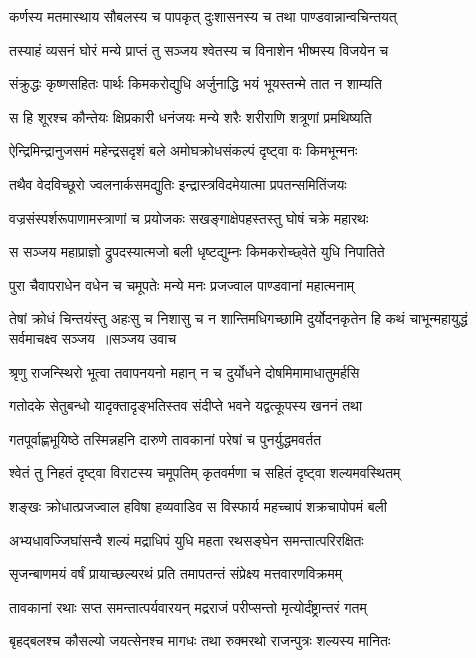 \twolineshloka
{कर्णस्य मतमास्थाय सौबलस्य च पापकृत्}
{दुःशासनस्य च तथा पाण्डवान्नान्वचिन्तयत्}


\twolineshloka
{तस्याहं व्यसनं घोरं मन्ये प्राप्तं तु सञ्जय}
{श्वेतस्य च विनाशेन भीष्मस्य विजयेन च}


\twolineshloka
{संक्रुद्धः कृष्णसहितः पार्थः किमकरोद्युधि}
{अर्जुनाद्धि भयं भूयस्तन्मे तात न शाम्यति}


\twolineshloka
{स हि शूरश्च कौन्तेयः क्षिप्रकारी धनंजयः}
{मन्ये शरैः शरीराणि शत्रूणां प्रमथिष्यति}


\twolineshloka
{ऐन्द्रिमिन्द्रानुजसमं महेन्द्रसदृशं बले}
{अमोघक्रोधसंकल्पं दृष्ट्वा वः किमभून्मनः}


\twolineshloka
{तथैव वेदविच्छूरो ज्वलनार्कसमद्युतिः}
{इन्द्रास्त्रविदमेयात्मा प्रपतन्समितिंजयः}


\twolineshloka
{वज्रसंस्पर्शरूपाणामस्त्राणां च प्रयोजकः}
{सखङ्गाक्षेपहस्तस्तु घोषं चक्रे महारथः}


\twolineshloka
{स सञ्जय महाप्राज्ञो द्रुपदस्यात्मजो बली}
{धृष्टद्युम्नः किमकरोच्छ्वेते युधि निपातिते}


\twolineshloka
{पुरा चैवापराधेन वधेन च चमूपतेः}
{मन्ये मनः प्रजज्वाल पाण्डवानां महात्मनाम्}


\fourlineindentedshloka
{तेषां क्रोधं चिन्तयंस्तु अहःसु च निशासु च}
{न शान्तिमधिगच्छामि दुर्योदनकृतेन हि}
{कथं चाभून्महायुद्धं सर्वमाचक्ष्व सञ्जय ॥सञ्जय उवाच}
{}


\twolineshloka
{श्रृणु राजन्स्थिरो भूत्वा तवापनयनो महान्}
{न च दुर्योधने दोषमिमामाधातुमर्हसि}


\twolineshloka
{गतोदके सेतुबन्धो यादृक्तादृङ्भतिस्तव}
{संदीप्ते भवने यद्वत्कूपस्य खननं तथा}


\twolineshloka
{गतपूर्वाह्णभूयिष्ठे तस्मिन्नहनि दारुणे}
{तावकानां परेषां च पुनर्युद्धमवर्तत}


\twolineshloka
{श्वेतं तु निहतं दृष्ट्वा विराटस्य चमूपतिम्}
{कृतवर्मणा च सहितं दृष्ट्वा शल्यमवस्थितम्}


\twolineshloka
{शङ्खः क्रोधात्प्रजज्वाल हविषा हव्यवाडिव}
{स विस्फार्य महच्चापं शक्रचापोपमं बली}


\twolineshloka
{अभ्यधावज्जिघांसन्वै शल्यं मद्राधिपं युधि}
{महता रथसङ्घेन समन्तात्परिरक्षितः}


\twolineshloka
{सृजन्बाणमयं वर्षं प्रायाच्छल्यरथं प्रति}
{तमापतन्तं संप्रेक्ष्य मत्तवारणविक्रमम्}


\twolineshloka
{तावकानां रथाः सप्त समन्तात्पर्यवारयन्}
{मद्रराजं परीप्सन्तो मृत्योर्दंष्ट्रान्तरं गतम्}


\twolineshloka
{बृहद्बलश्च कौसल्यो जयत्सेनश्च मागधः}
{तथा रुक्मरथो राजन्पुत्रः शल्यस्य मानितः}


